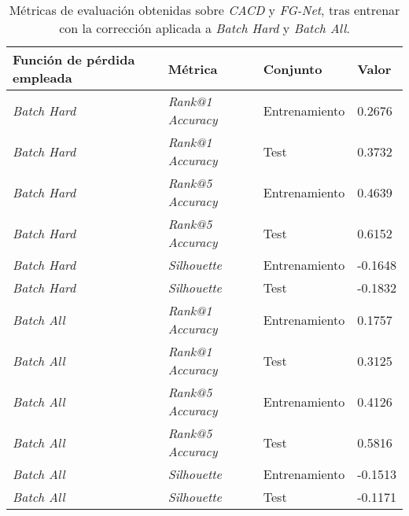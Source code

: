 \begin{table}[!hbtp]
\centering
\begin{tabular}{|l|l|l|l|}
    \hline
    Función de pérdida empleada & Métrica &  Conjunto & Valor \\
    \hline

    \textit{Batch Hard} & \textit{Rank@1 Accuracy} & Entrenamiento & 0.2676 \\
    \textit{Batch Hard} & \textit{Rank@1 Accuracy} & Test  & 0.3732  \\
    \textit{Batch Hard} & \textit{Rank@5 Accuracy} & Entrenamiento & 0.4639  \\
    \textit{Batch Hard} & \textit{Rank@5 Accuracy} & Test & 0.6152 \\
    \textit{Batch Hard} & \textit{Silhouette} & Entrenamiento & -0.1648 \\
    \textit{Batch Hard} & \textit{Silhouette} & Test & -0.1832 \\

    \hline

    \textit{Batch All} & \textit{Rank@1 Accuracy} & Entrenamiento & 0.1757 \\
    \textit{Batch All} & \textit{Rank@1 Accuracy} & Test & 0.3125  \\
    \textit{Batch All} & \textit{Rank@5 Accuracy} & Entrenamiento & 0.4126  \\
    \textit{Batch All} & \textit{Rank@5 Accuracy} & Test & 0.5816 \\
    \textit{Batch All} & \textit{Silhouette} & Entrenamiento & -0.1513 \\
    \textit{Batch All} & \textit{Silhouette} & Test & -0.1171 \\

    \hline

\end{tabular}
\caption{Métricas de evaluación obtenidas sobre \textit{CACD} y \textit{FG-Net}, tras entrenar con la corrección aplicada a \textit{Batch Hard} y \textit{Batch All}.}
\label{table:resultados_cacd_corregido}
\end{table}

